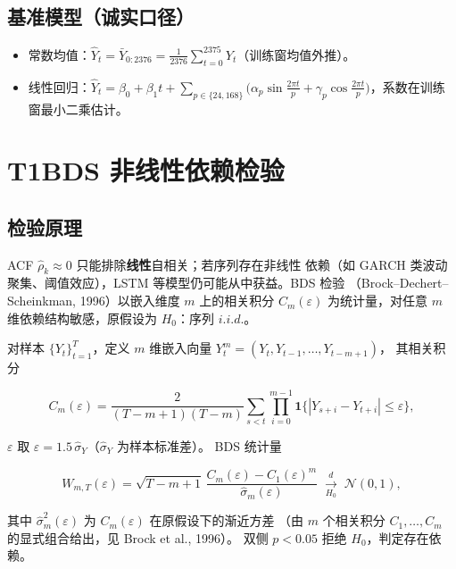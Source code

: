 \documentclass{internal-report}
\begin{document}
\subsection{基准模型（诚实口径）}

\begin{itemize}
  \item 常数均值：$\hat{Y}_t = \bar{Y}_{0:2376} = \frac{1}{2376}\sum_{t=0}^{2375} Y_t$（训练窗均值外推）。
  \item 线性回归：$\hat{Y}_t = \beta_0 + \beta_1 t + \sum_{p\in\{24,168\}}\bigl(\alpha_p\sin\frac{2\pi t}{p} + \gamma_p\cos\frac{2\pi t}{p}\bigr)$，系数在训练窗最小二乘估计。
\end{itemize}

\section{T1\quad BDS 非线性依赖检验}

\subsection{检验原理}

ACF $\hat{\rho}_k \approx 0$ 只能排除\textbf{线性}自相关；若序列存在非线性
依赖（如 GARCH 类波动聚集、阈值效应），LSTM 等模型仍可能从中获益。BDS 检验
（Brock--Dechert--Scheinkman, 1996）以嵌入维度 $m$ 上的相关积分 $C_m(\varepsilon)$
为统计量，对任意 $m$ 维依赖结构敏感，原假设为 $H_0$：序列 $i.i.d.$。

对样本 $\{Y_t\}_{t=1}^{T}$，定义 $m$ 维嵌入向量 $Y_t^m=(Y_t,Y_{t-1},\ldots,Y_{t-m+1})$，
其相关积分

\begin{equation}
  C_m(\varepsilon) = \frac{2}{(T-m+1)(T-m)}
    \sum_{s<t} \prod_{i=0}^{m-1} \mathbf{1}\bigl\{|Y_{s+i}-Y_{t+i}| \le \varepsilon\bigr\},
  \label{eq:corrintegral}
\end{equation}

$\varepsilon$ 取 $\varepsilon = 1.5\,\hat{\sigma}_Y$（$\hat{\sigma}_Y$ 为样本标准差）。
BDS 统计量

\begin{equation}
  W_{m,T}(\varepsilon) = \sqrt{T-m+1}\,
    \frac{C_m(\varepsilon) - C_1(\varepsilon)^{m}}{\hat{\sigma}_m(\varepsilon)}
  \;\xrightarrow[H_0]{d}\;\mathcal{N}(0,1),
  \label{eq:bdsstat}
\end{equation}

其中 $\hat{\sigma}_m^2(\varepsilon)$ 为 $C_m(\varepsilon)$ 在原假设下的渐近方差
（由 $m$ 个相关积分 $C_1,\ldots,C_m$ 的显式组合给出，见 Brock et al., 1996）。
双侧 $p<0.05$ 拒绝 $H_0$，判定存在依赖。
\end{document}
